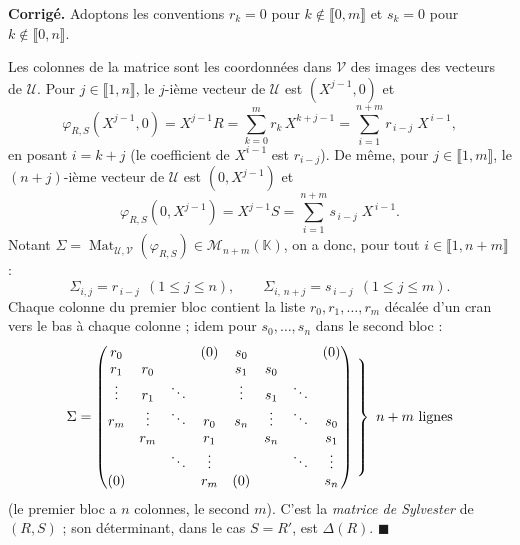 \documentclass[11pt,a4paper]{article}
\newenvironment{corrige}
  {\par\medskip\noindent
   \begin{tcolorbox}[blanker, breakable,
     borderline west={2.5pt}{0pt}{vertP},
     left=10pt, top=2pt, bottom=2pt]
   {\color{vertP}\bfseries Corrigé.}\hspace{0.5em}\ignorespaces}
  {\hfill$\blacksquare$\end{tcolorbox}\medskip}
\newcommand{\K}{\mathbb{K}}
\newcommand{\ii}[2]{\llbracket #1,#2\rrbracket}
\DeclareMathOperator{\Mat}{Mat}
\begin{document}
\begin{corrige}
Adoptons les conventions $r_k=0$ pour $k\notin\ii{0}{m}$ et
$s_k=0$ pour $k\notin\ii{0}{n}$.

Les colonnes de la matrice sont les coordonnées dans $\mathcal{V}$
des images des vecteurs de $\mathcal{U}$. Pour
$j\in\ii{1}{n}$, le $j$-ième vecteur de $\mathcal{U}$ est
$(X^{j-1},0)$ et
\[
\varphi_{R,S}(X^{j-1},0)=X^{j-1}R
=\sum_{k=0}^{m}r_k\,X^{k+j-1}
=\sum_{i=1}^{n+m}r_{\,i-j}\;X^{\,i-1},
\]
en posant $i=k+j$ (le coefficient de $X^{i-1}$ est $r_{i-j}$). De
même, pour $j\in\ii{1}{m}$, le $(n+j)$-ième vecteur de $\mathcal{U}$
est $(0,X^{j-1})$ et
\[
\varphi_{R,S}(0,X^{j-1})=X^{j-1}S
=\sum_{i=1}^{n+m}s_{\,i-j}\;X^{\,i-1}.
\]
Notant $\Sigma=\Mat_{\mathcal{U},\mathcal{V}}(\varphi_{R,S})
\in\mathcal{M}_{n+m}(\K)$, on a donc, pour tout
$i\in\ii{1}{n+m}$ :
\[
\boxed{\;\Sigma_{i,j}=r_{\,i-j}\ \ (1\le j\le n),
\qquad
\Sigma_{i,\,n+j}=s_{\,i-j}\ \ (1\le j\le m).\;}
\]
Chaque colonne du premier bloc contient la liste
$r_0,r_1,\dots,r_m$ décalée d'un cran vers le bas à chaque colonne ;
idem pour $s_0,\dots,s_n$ dans le second bloc :
\[
\Sigma=
\begin{pmatrix}
r_0    &        &        &(0)     & s_0    &        &  &(0)  \\
r_1    & r_0    &        &        & s_1    & s_0    &  &     \\
\vdots & r_1    & \ddots &        & \vdots & s_1    & \ddots & \\
r_m    & \vdots & \ddots & r_0    & s_n    & \vdots & \ddots & s_0\\
       & r_m    &        & r_1    &        & s_n    &        & s_1\\
       &        & \ddots & \vdots &        &        & \ddots & \vdots\\
(0)    &        &        & r_m    & (0)    &        &        & s_n
\end{pmatrix}
\begin{matrix}
\left.\vphantom{\begin{matrix}1\\1\\1\\1\\1\\1\\1\end{matrix}}
\right\}\ n+m\ \text{lignes}
\end{matrix}
\]
(le premier bloc a $n$ colonnes, le second $m$). C'est la
\emph{matrice de Sylvester} de $(R,S)$ ; son déterminant, dans le cas
$S=R'$, est $\Delta(R)$.
\end{corrige}
\end{document}
